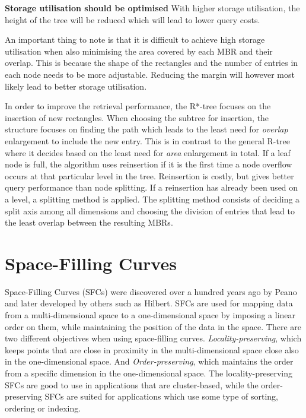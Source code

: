 \noindent
\textbf{Storage utilisation should be optimised}\newline
With higher storage utilisation, the height of the tree will be reduced which will lead to lower query costs. \newline

\noindent
An important thing to note is that it is difficult to achieve high storage utilisation when also minimising the area covered by each MBR and their overlap. This is because the shape of the rectangles and the number of entries in each node needs to be more adjustable. Reducing the margin will however most likely lead to better storage utilisation. \newline

\noindent
In order to improve the retrieval performance, the R*-tree focuses on the insertion of new rectangles. When choosing the subtree for insertion, the structure focuses on finding the path which leads to the least need for \emph{overlap} enlargement to include the new entry. This is in contrast to the general R-tree where it decides based on the least need for \emph{area} enlargement in total. If a leaf node is full, the algorithm uses reinsertion if it is the first time a node overflow occurs at that particular level in the tree. Reinsertion is costly, but gives better query performance than node splitting. If a reinsertion has already been used on a level, a splitting method is applied. The splitting method consists of deciding a split axis among all dimensions and choosing the division of entries that lead to the least overlap between the resulting MBRs.

\section{Space-Filling Curves}
Space-Filling Curves (SFCs) were discovered over a hundred years ago by Peano\cite{peano} and  later developed by others such as Hilbert\cite{hilbert}. SFCs are used for mapping data from a multi-dimensional space to a one-dimensional space by imposing a linear order on them, while maintaining the position of the data in the space. There are two different objectives when using space-filling curves\cite{IrregularSpace}. \emph{Locality-preserving}, which keeps points that are close in proximity in the multi-dimensional space close also in the one-dimensional space. And \emph{Order-preserving}, which maintains the order from a specific dimension in the one-dimensional space. The locality-preserving SFCs are good to use in applications that are cluster-based, while the order-preserving SFCs are suited for applications which use some type of sorting, ordering or indexing. \newline

